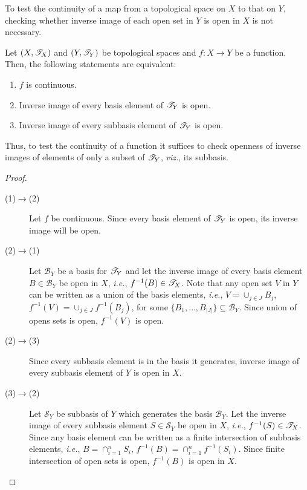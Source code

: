 \documentclass[a4paper,english,12pt]{article}
\begin{document}
To test the continuity of a map from a topological space on $X$ to that on $Y$, checking whether inverse image of each open set in $Y$ is open in $X$ is not necessary.
\begin{thm}
Let $(X,\mathscr{T}_X)$ and $(Y,\mathscr{T}_Y)$ be topological spaces and $f:X\to Y$ be a function. Then, the following statements are equivalent:
\begin{enumerate}
\item $f$ is continuous.
\item Inverse image of every basis element of $\mathscr{T}_Y$ is open.
\item Inverse image of every subbasis element of $\mathscr{T}_Y$ is open.
\end{enumerate}
Thus, to test the continuity of a function it suffices to check openness of inverse images of elements of only a subset of $\mathscr{T}_Y$, \emph{viz.}, its subbasis.
\label{bas}
\end{thm}
\begin{proof}
\begin{description}
\item[(1)$\to$(2)]Let $f$ be continuous. Since every basis element of $\mathscr{T}_Y$ is open, its inverse image will be open.
\item[(2)$\to$(1)]Let $\mathcal{B}_Y$ be a basis for $\mathscr{T}_Y$ and let the inverse image of every basis element $B\in \mathcal{B}_Y$ be open in $X$, \emph{i.e.}, $f^{-1}(B)\in \mathscr{T}_X$. Note that any open set $V$ in $Y$ can be written as a union of the basis elements, \emph{i.e.}, $V=\cup _{j\in J}B_j$, $f^{-1}(V)=\cup _{j\in J}f^{-1}(B_j)$, for some $\{B_1,\dots,B_{|J|}\}\subseteq \mathcal{B}_Y$. Since union of opens sets is open, $f^{-1}(V)$ is open.
\item[(2)$\to$(3)]Since every subbasis element is in the basis it generates, inverse image of every subbasis element of $Y$ is open in $X$.
\item[(3)$\to$(2)]Let $\mathcal{S}_Y$ be subbasis of $Y$ which generates the basis $\mathcal{B}_Y$. Let the inverse image of every subbasis element $S\in \mathcal{S}_Y$ be open in $X$, \emph{i.e.}, $f^{-1}(S)\in \mathscr{T}_X$. Since any basis element can be written as a finite intersection of subbasis elements, \emph{i.e.}, $B=\cap _{i=1}^{n}S_i$, $f^{-1}(B)=\cap _{i=1}^{n}f^{-1}(S_i)$. Since finite intersection of open sets is open, $f^{-1}(B)$ is open in $X$.
\end{description}
\end{proof}
\end{document}
